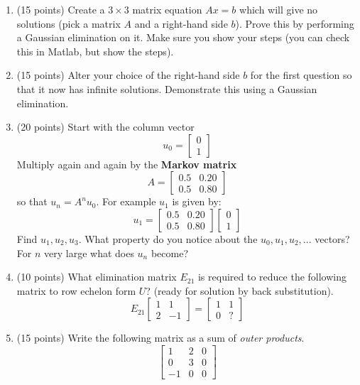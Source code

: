 \documentclass[10pt, a4paper]{article}
\theoremstyle{break}
\begin{document}
\begin{enumerate}
\item (15 points) Create a $3 \times 3$ matrix equation $Ax=b$ which will give no solutions (pick a matrix $A$ and a right-hand side $b$). Prove this by performing a Gaussian elimination on it. Make sure you show your steps (you can check this in Matlab, but show the steps). 
\item (15 points) Alter your choice of the right-hand side $b$ for the first question so that it now has infinite solutions. Demonstrate this using a Gaussian elimination. 
\item (20 points) Start with the column vector $$u_0=\begin{bmatrix} 0 \\ 1 \end{bmatrix}$$ Multiply again and again by the \textbf{Markov matrix} $$A= \begin{bmatrix}
0.5 & 0.20 \\
0.5 & 0.80
\end{bmatrix} $$
so that $u_n=A^n u_0$. For example $u_1$ is given by:
$$u_1=\begin{bmatrix}
0.5 & 0.20 \\
0.5 & 0.80
\end{bmatrix} \begin{bmatrix} 0 \\1 \end{bmatrix}$$
Find $u_1,u_2,u_3$. What property do you notice about the $u_0, u_1, u_2, ...$ vectors? For $n$ very large what does $u_n$ become?
\item (10 points) What elimination matrix $E_{21}$ is required to reduce the following matrix to row echelon form $U$? (ready for solution by back substitution).
\begin{equation}
E_{21}
\begin{bmatrix}
1 & 1 \\
2 & -1 
\end{bmatrix}
=\begin{bmatrix}
1 &1 \\ 0 & ?
\end{bmatrix}
\end{equation}
\item (15 points) Write the following matrix as a sum of \textit{outer products}. 
\begin{equation}
\begin{bmatrix}
 1 & 2 & 0 \\
 0 & 3 & 0 \\
 -1 & 0 &0

\end{bmatrix}
\end{equation}
\end{enumerate}
\end{document}
